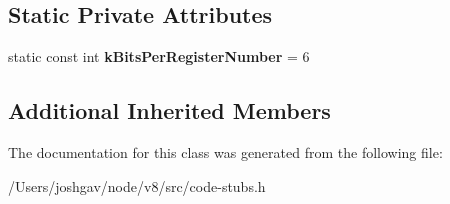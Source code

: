 \subsection*{Static Private Attributes}
\begin{DoxyCompactItemize}
\item 
static const int {\bfseries k\+Bits\+Per\+Register\+Number} = 6\hypertarget{classv8_1_1internal_1_1_double_to_i_stub_a50c05f8f44532e3c1add4b81c6b40164}{}\label{classv8_1_1internal_1_1_double_to_i_stub_a50c05f8f44532e3c1add4b81c6b40164}

\end{DoxyCompactItemize}
\subsection*{Additional Inherited Members}


The documentation for this class was generated from the following file\+:\begin{DoxyCompactItemize}
\item 
/\+Users/joshgav/node/v8/src/code-\/stubs.\+h\end{DoxyCompactItemize}
